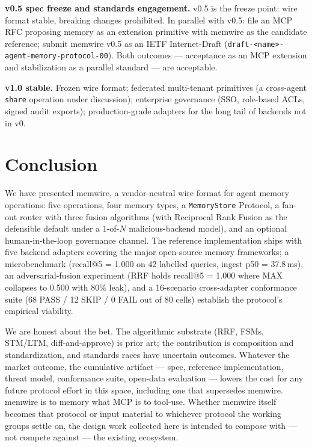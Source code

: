 \documentclass[11pt,letterpaper,twocolumn]{article}
\begin{document}
\textbf{v0.5 spec freeze and standards engagement.} v0.5 is the freeze point: wire format stable, breaking changes prohibited. In parallel with v0.5: file an MCP RFC proposing memory as an extension primitive with memwire as the candidate reference; submit memwire v0.5 as an IETF Internet-Draft (\texttt{draft-<name>-agent-memory-protocol-00}). Both outcomes --- acceptance as an MCP extension and stabilization as a parallel standard --- are acceptable.

\textbf{v1.0 stable.} Frozen wire format; federated multi-tenant primitives (a cross-agent \texttt{share} operation under discussion); enterprise governance (SSO, role-based ACLs, signed audit exports); production-grade adapters for the long tail of backends not in v0.

\section{Conclusion}
\label{sec:conclusion}

We have presented memwire, a vendor-neutral wire format for agent memory operations: five operations, four memory types, a \texttt{MemoryStore} Protocol, a fan-out router with three fusion algorithms (with Reciprocal Rank Fusion as the defensible default under a 1-of-$N$ malicious-backend model), and an optional human-in-the-loop governance channel. The reference implementation ships with five backend adapters covering the major open-source memory frameworks; a microbenchmark (recall@5 = 1.000 on 42 labelled queries, ingest p50 = 37.8\,ms), an adversarial-fusion experiment (RRF holds recall@5 = 1.000 where MAX collapses to 0.500 with 80\% leak), and a 16-scenario cross-adapter conformance suite (68 PASS / 12 SKIP / 0 FAIL out of 80 cells) establish the protocol's empirical viability.

We are honest about the bet. The algorithmic substrate (RRF, FSMs, STM/LTM, diff-and-approve) is prior art; the contribution is composition and standardization, and standards races have uncertain outcomes. Whatever the market outcome, the cumulative artifact --- spec, reference implementation, threat model, conformance suite, open-data evaluation --- lowers the cost for any future protocol effort in this space, including one that supersedes memwire. memwire is to memory what MCP is to tool-use. Whether memwire itself becomes that protocol or input material to whichever protocol the working groups settle on, the design work collected here is intended to compose with --- not compete against --- the existing ecosystem.
\end{document}

